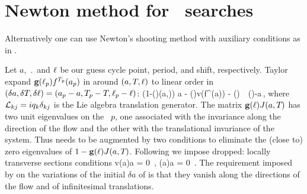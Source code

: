

\section{Newton method  for \rpo\ searches}
\label{sec:NewtRPOs}

Alternatively one can use Newton's shooting method with auxiliary conditions 
as in .

Let $a$, $\period{}$ and $\ell$
be our guess cycle point, period, and shift, respectively.
Taylor expand $\mathbf{g}(\ell_p) {f^{{T_{p}}}(a_p)}$ in 
around $(a, {T_{}}, \ell)$ to linear order in
$(\delta a,\delta {T_{}},\delta \ell)
   =(a_p-a,{T_{p}} - {T_{}},\ell_p-\ell)$:
\beq
    \left({1}-(\shift)\jMps(a,\period{})\right) \delta a
   - (\shift)v(f^{\period{}}(a)) \delta \period{}
                            - \translGen{}(\shift) \delta \shift
                    \,\simeq\, (\shift)-a\,,
    \label{eq:NewtonBasicCond}
\eeq
where $\mathcal{L}_{kj}=i q_k \delta_{kj}$ is the Lie algebra translation
generator. The matrix $\mathbf{g}(\ell){J}(a,{T_{}})$
has two unit eigenvalues on the \rpo\ $p$,
one associated with the invariance along
the direction of the flow and the other with the
translational invariance of the system. Thus 
needs to be augmented by two conditions to
eliminate the (close to) zero eigenvalues of
$1-\mathbf{g}(\ell){J}(a,{T_{}})$. Following
 we impose dropped: locally transverse sections
conditions
\beq
    v(a)\cdot\delta a  =  0
    \,,\qquad
    \left(\translGen {}a\right)\cdot \delta a  =  0
\,.
\label{eq:NewtonAux}
\eeq
The requirement imposed by 
on the variations of the initial $\delta a$ of 
is that they   vanish along the directions of the flow
and of infinitesimal translations.

